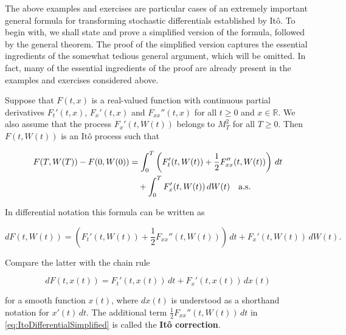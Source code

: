The above examples and exercises are particular cases of an extremely important general formula for transforming stochastic differentials established by Itô. To begin with, we shall state and prove a simplified version of the formula, followed by the general theorem. The proof of the simplified version captures the essential ingredients of the somewhat tedious general argument, which will be omitted. In fact, many of the essential ingredients of the proof are already present in the examples and exercises considered above.

\begin{Theorem}
\label{th:7.5}
Suppose that $F(t, x)$ is a real-valued function with continuous partial derivatives $F_t'(t, x)$, $F_x'(t, x)$ and $F_{xx}''(t, x)$ for all $t \geq 0$ and $x \in \mathbb{R}$. We also assume that the process $F_x'(t, W(t))$ belongs to $M_T^2$ for all $T \geq 0$. Then $F(t, W(t))$ is an Itô process such that

\begin{align}
F(T, W(T)) - F(0, W(0)) & = \int_0^T \left(F_t'(t, W(t)) + \frac{1}{2} F_{xx}''(t, W(t))\right) \, dt \label{eq:ItoFormulaSimplified} \\
& \quad + \int_0^T F_x'(t, W(t)) \, dW(t) \quad \text{a.s.} \notag
\end{align}

In differential notation this formula can be written as

\begin{equation}
dF(t, W(t)) = \left(F_t'(t, W(t)) + \frac{1}{2} F_{xx}''(t, W(t))\right) \, dt + F_x'(t, W(t)) \, dW(t).
\label{eq:ItoDifferentialSimplified}
\end{equation}
\end{Theorem}

\begin{Remark}
\label{rm:7.2}
Compare the latter with the chain rule

\begin{equation}
dF(t, x(t)) = F_t'(t, x(t)) \, dt + F_x'(t, x(t)) \, dx(t)
\end{equation}

for a smooth function $x(t)$, where $dx(t)$ is understood as a shorthand notation for $x'(t) \, dt$. The additional term $\frac{1}{2} F_{xx}''(t, W(t)) \, dt$ in \eqref{eq:ItoDifferentialSimplified} is called the \textbf{Itô correction}.
\end{Remark}

